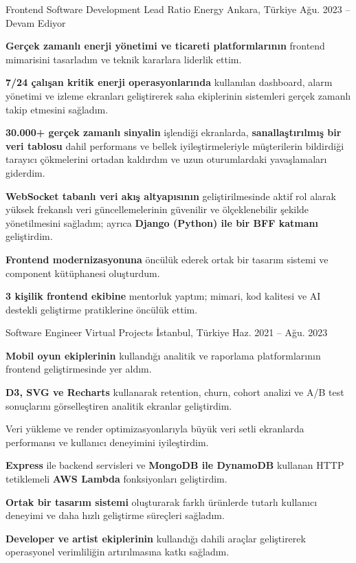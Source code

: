 \begin{cventries}

\cventry
{Frontend Software Development Lead}
{Ratio Energy}
{Ankara, Türkiye}
{Ağu. 2023 -- Devam Ediyor}
{\begin{cvitems}
\item {\textbf{Gerçek zamanlı enerji yönetimi ve ticareti platformlarının} frontend mimarisini tasarladım ve teknik kararlara liderlik ettim.}
\item {\textbf{7/24 çalışan kritik enerji operasyonlarında} kullanılan dashboard, alarm yönetimi ve izleme ekranları geliştirerek saha ekiplerinin sistemleri gerçek zamanlı takip etmesini sağladım.}
\item {\textbf{30.000+ gerçek zamanlı sinyalin} işlendiği ekranlarda, \textbf{sanallaştırılmış bir veri tablosu} dahil performans ve bellek iyileştirmeleriyle müşterilerin bildirdiği tarayıcı çökmelerini ortadan kaldırdım ve uzun oturumlardaki yavaşlamaları giderdim.}
\item {\textbf{WebSocket tabanlı veri akış altyapısının} geliştirilmesinde aktif rol alarak yüksek frekanslı veri güncellemelerinin güvenilir ve ölçeklenebilir şekilde yönetilmesini sağladım; ayrıca \textbf{Django (Python) ile bir BFF katmanı} geliştirdim.}
\item {\textbf{Frontend modernizasyonuna} öncülük ederek ortak bir tasarım sistemi ve component kütüphanesi oluşturdum.}
\item {\textbf{3 kişilik frontend ekibine} mentorluk yaptım; mimari, kod kalitesi ve AI destekli geliştirme pratiklerine öncülük ettim.}
\end{cvitems}}

\cventry
{Software Engineer}
{Virtual Projects}
{İstanbul, Türkiye}
{Haz. 2021 -- Ağu. 2023}
{\begin{cvitems}
\item {\textbf{Mobil oyun ekiplerinin} kullandığı analitik ve raporlama platformlarının frontend geliştirmesinde yer aldım.}
\item {\textbf{D3, SVG ve Recharts} kullanarak retention, churn, cohort analizi ve A/B test sonuçlarını görselleştiren analitik ekranlar geliştirdim.}
\item {Veri yükleme ve render optimizasyonlarıyla büyük veri setli ekranlarda performansı ve kullanıcı deneyimini iyileştirdim.}
\item {\textbf{Express} ile backend servisleri ve \textbf{MongoDB ile DynamoDB} kullanan HTTP tetiklemeli \textbf{AWS Lambda} fonksiyonları geliştirdim.}
\item {\textbf{Ortak bir tasarım sistemi} oluşturarak farklı ürünlerde tutarlı kullanıcı deneyimi ve daha hızlı geliştirme süreçleri sağladım.}
\item {\textbf{Developer ve artist ekiplerinin} kullandığı dahili araçlar geliştirerek operasyonel verimliliğin artırılmasına katkı sağladım.}
\end{cvitems}}


\end{cventries}
